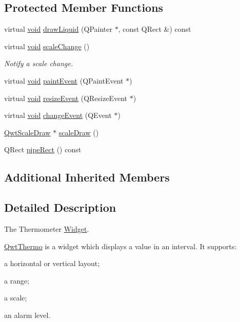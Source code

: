 \subsection*{Protected Member Functions}
\begin{DoxyCompactItemize}
\item 
virtual \hyperlink{group___u_a_v_objects_plugin_ga444cf2ff3f0ecbe028adce838d373f5c}{void} \hyperlink{class_qwt_thermo_ab9cca3cab3a8950b66e14b995b86beb8}{draw\-Liquid} (Q\-Painter $\ast$, const Q\-Rect \&) const 
\item 
virtual \hyperlink{group___u_a_v_objects_plugin_ga444cf2ff3f0ecbe028adce838d373f5c}{void} \hyperlink{class_qwt_thermo_a3f2f5077580235a5a776805a9721c8ba}{scale\-Change} ()
\begin{DoxyCompactList}\small\item\em Notify a scale change. \end{DoxyCompactList}\item 
virtual \hyperlink{group___u_a_v_objects_plugin_ga444cf2ff3f0ecbe028adce838d373f5c}{void} \hyperlink{class_qwt_thermo_a7ae9fe53b0b0925d88fd9e1e4eb026f7}{paint\-Event} (Q\-Paint\-Event $\ast$)
\item 
virtual \hyperlink{group___u_a_v_objects_plugin_ga444cf2ff3f0ecbe028adce838d373f5c}{void} \hyperlink{class_qwt_thermo_a31ea86c3ab9c6925752dc8d6215fd9f0}{resize\-Event} (Q\-Resize\-Event $\ast$)
\item 
virtual \hyperlink{group___u_a_v_objects_plugin_ga444cf2ff3f0ecbe028adce838d373f5c}{void} \hyperlink{class_qwt_thermo_abb6858178fa0361ce9c4775944b96352}{change\-Event} (Q\-Event $\ast$)
\item 
\hyperlink{class_qwt_scale_draw}{Qwt\-Scale\-Draw} $\ast$ \hyperlink{class_qwt_thermo_a7d0f262032c034c5da703ec2f2d120b7}{scale\-Draw} ()
\item 
Q\-Rect \hyperlink{class_qwt_thermo_a3359ca7488990dab26b182448b38395b}{pipe\-Rect} () const 
\end{DoxyCompactItemize}
\subsection*{Additional Inherited Members}


\subsection{Detailed Description}
The Thermometer \hyperlink{class_widget}{Widget}. 

\hyperlink{class_qwt_thermo}{Qwt\-Thermo} is a widget which displays a value in an interval. It supports\-:
\begin{DoxyItemize}
\item a horizontal or vertical layout;
\item a range;
\item a scale;
\item an alarm level.
\end{DoxyItemize}



